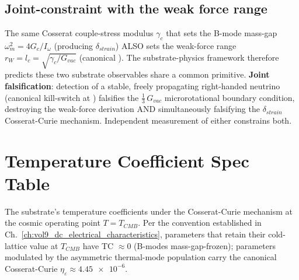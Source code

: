 \subsection{Joint-constraint with the weak force range}
\label{subsec:vol9_joint_constraint}

The same Cosserat couple-stress modulus $\gamma_c$ that sets the B-mode mass-gap $\omega_m^2 = 4 G_c/I_\omega$ (producing $\delta_{strain}$) ALSO sets the weak-force range $r_W = l_c = \sqrt{\gamma_c/G_{vac}}$ (canonical ). The substrate-physics framework therefore predicts these two substrate observables share a common primitive. \textbf{Joint falsification}: detection of a stable, freely propagating right-handed neutrino (canonical kill-switch at ) falsifies the $\frac{1}{3}\,G_{vac}$ microrotational boundary condition, destroying the weak-force derivation AND simultaneously falsifying the $\delta_{strain}$ Cosserat-Curie mechanism. Independent measurement of either constrains both.

\section{Temperature Coefficient Spec Table}
\label{sec:vol9_temperature_spec_table}

The substrate's temperature coefficients under the Cosserat-Curie mechanism at the cosmic operating point $T = T_{CMB}$. Per the convention established in Ch.~\ref{ch:vol9_dc_electrical_characteristics}, parameters that retain their cold-lattice value at $T_{CMB}$ have TC $\approx 0$ (B-modes mass-gap-frozen); parameters modulated by the asymmetric thermal-mode population carry the canonical Cosserat-Curie $\eta_\varepsilon \approx \num{4.45e-6}$.

